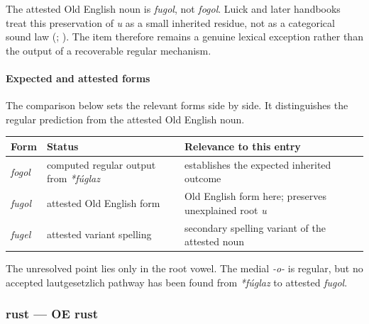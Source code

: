 \documentclass[
  british,
  a4paper,
]{article}
\newcounter{none} %
\begin{document}
The attested Old English noun is \emph{fugol}, not \emph{fogol}. Luick
and later handbooks treat this preservation of \emph{u} as a small
inherited residue, not as a categorical sound law
(;
). The item
therefore remains a genuine lexical exception rather than the output of
a recoverable regular mechanism.

\paragraph{Expected and attested
forms}\label{expected-and-attested-forms}

The comparison below sets the relevant forms side by side. It
distinguishes the regular prediction from the attested Old English noun.

{\def\LTcaptype{none} %
\begin{longtable}[]{@{}
  >{\raggedright\arraybackslash}p{}
  >{\raggedright\arraybackslash}p{}
  >{\raggedright\arraybackslash}p{}@{}}
\toprule\noalign{}
\begin{minipage}[b]{\linewidth}\raggedright
Form
\end{minipage} & \begin{minipage}[b]{\linewidth}\raggedright
Status
\end{minipage} & \begin{minipage}[b]{\linewidth}\raggedright
Relevance to this entry
\end{minipage} \\
\midrule\noalign{}
\endhead
\bottomrule\noalign{}
\endlastfoot
\emph{fogol} & computed regular output from \emph{*fúglaz} & establishes
the expected inherited outcome \\
\emph{fugol} & attested Old English form & Old English form here;
preserves unexplained root \emph{u} \\
\emph{fugel} & attested variant spelling & secondary spelling variant of
the attested noun \\
\end{longtable}
}

The unresolved point lies only in the root vowel. The medial \emph{-o-}
is regular, but no accepted lautgesetzlich pathway has been found from
\emph{*fúglaz} to attested \emph{fugol}.

\subsubsection{rust --- OE rust}\label{rust-oe-rust}
\end{document}
